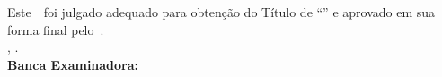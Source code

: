 \imprimircapa

\imprimirfolhaderosto*

\begin{fichacatalografica}
	
\end{fichacatalografica}

\begin{folhadeaprovacao}
	\OnehalfSpacing
	\centering
	\imprimirautor\\%
	\vspace*{10pt}		
	\textbf{\imprimirtitulo}%
	\ifnotempty{\imprimirsubtitulo}{:~\imprimirsubtitulo}\\%
	\vspace*{\baselineskip}
	Este~\imprimirtipotrabalho~foi julgado adequado para obtenção do Título de “\imprimirformacao” e aprovado em sua forma final pelo~\imprimirprograma. \\
		\vspace*{\baselineskip}
	\imprimirlocal, \imprimirdata. \\
	\vspace*{2\baselineskip}
	\vspace*{2\baselineskip}
	\textbf{Banca Examinadora:} \\
	\vspace*{\baselineskip}
	\assinatura{\OnehalfSpacing\imprimirorientador \\ \imprimirorientadorRotulo}
	\vspace*{\baselineskip}

	\vspace*{\baselineskip}


\end{folhadeaprovacao}


